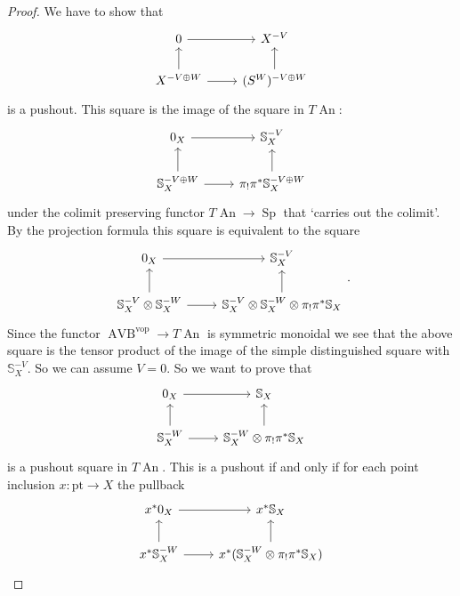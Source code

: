 \documentclass{article}
\newcommand{\pt}{\mathrm{pt}}
\newcommand{\vop}{\mathrm{vop}}
\DeclareMathOperator{\AVB}{AVB}
\DeclareMathOperator{\An}{An}
\DeclareMathOperator{\Sp}{Sp}
\begin{document}
\begin{proof}
    We have to show that 
    \[\begin{tikzcd}
        0 & {X^{-V}} \\
        {X^{-V\oplus W}} & {(S^{W})^{-V\oplus W}}
        \arrow[to=1-2, from=1-1]
        \arrow[to=1-1, from=2-1]
        \arrow[to=1-2, from=2-2]
        \arrow[to=2-2, from=2-1]
    \end{tikzcd}\]
    is a pushout.
    This square is the image of the square in $T\An$:
    \[\begin{tikzcd}
        {0_X} & {\mathbb S^{-V}_X} \\
        {\mathbb S_X^{-V\oplus W}} & {\pi_! \pi^* \mathbb S_X^{-V\oplus W}}
        \arrow[to=1-2, from=1-1]
        \arrow[to=1-1, from=2-1]
        \arrow[to=1-2, from=2-2]
        \arrow[to=2-2, from=2-1]
    \end{tikzcd}\]
    under the colimit preserving functor $T\An \to \Sp$ that `carries out the colimit'.
    By the projection formula this square is equivalent to the square 
    \[\begin{tikzcd}
        {0_X} & {\mathbb S^{-V}_X} \\
        {\mathbb S_X^{-V} \otimes \mathbb S_X^{-W}} & {\mathbb S_X^{-V} \otimes \mathbb S_X^{-W}\otimes\pi_! \pi^* \mathbb S_X}
        \arrow[to=1-2, from=1-1]
        \arrow[to=1-1, from=2-1]
        \arrow[to=1-2, from=2-2]
        \arrow[to=2-2, from=2-1]
    \end{tikzcd}.\]
    Since the functor $\AVB^\vop \to T\An$ is symmetric monoidal we see that the above square is the tensor product of the image of 
    the simple distinguished square with $\mathbb S_X^{-V}$. So we can assume $V = 0$. So we want to prove that 
\[\begin{tikzcd}
	{0_X} & {\mathbb S_X} \\
	{\mathbb S_X^{-W}} & {\mathbb S_X^{-W}\otimes\pi_! \pi^* \mathbb S_X}
	\arrow[to=1-2, from=1-1]
	\arrow[to=1-1, from=2-1]
	\arrow[to=1-2, from=2-2]
	\arrow[to=2-2, from=2-1]
\end{tikzcd}\]
is a pushout square in $T\An$. This is a pushout if and only if for each point inclusion $x \colon \pt \to X$ the pullback 
\[\begin{tikzcd}
	{x^*0_X} & {x^*\mathbb S_X} \\
	{x^*\mathbb S_X^{-W}} & {x^*(\mathbb S_X^{-W}\otimes\pi_! \pi^* \mathbb S_X)}
	\arrow[to=1-2, from=1-1]
	\arrow[to=1-1, from=2-1]
	\arrow[to=1-2, from=2-2]
	\arrow[to=2-2, from=2-1]
\end{tikzcd}\]

\end{proof}
\end{document}
